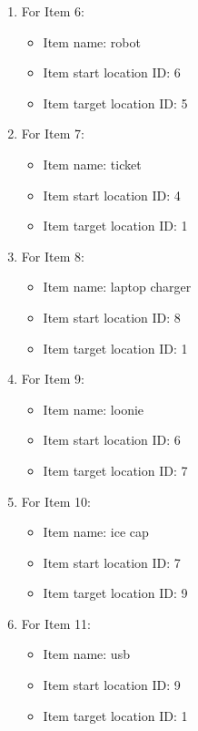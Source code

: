 \documentclass[11pt]{article}
\begin{document}
\begin{enumerate}
\begin{enumerate}
\begin{itemize}
    \item Item name: blue star
    \item Item start location ID: 3
    \item Item target location ID: 2
    \end{itemize}
        \item For Item 6:
    \begin{itemize}
    \item Item name: robot
    \item Item start location ID: 6
    \item Item target location ID: 5
    \end{itemize}
        \item For Item 7:
    \begin{itemize}
    \item Item name: ticket
    \item Item start location ID: 4
    \item Item target location ID: 1
    \end{itemize}
        \item For Item 8:
    \begin{itemize}
    \item Item name: laptop charger
    \item Item start location ID: 8
    \item Item target location ID: 1
    \end{itemize}
        \item For Item 9:
    \begin{itemize}
    \item Item name: loonie
    \item Item start location ID: 6
    \item Item target location ID: 7
    \end{itemize}
        \item For Item 10:
    \begin{itemize}
    \item Item name: ice cap
    \item Item start location ID: 7
    \item Item target location ID: 9
    \end{itemize}
        \item For Item 11:
    \begin{itemize}
    \item Item name: usb
    \item Item start location ID: 9
    \item Item target location ID: 1
    \end{itemize}
\end{enumerate}


\end{enumerate}
\end{document}
